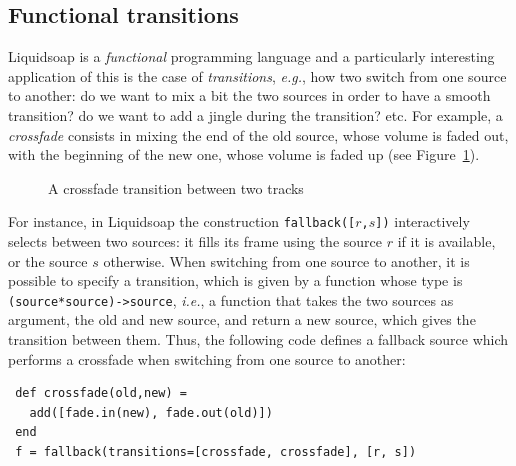 \documentclass{llncs}
\newcommand{\liquidsoap}{Liquidsoap}
\newcommand{\eg}{\emph{e.g.},}
\newcommand{\ie}{\emph{i.e.},}
\newcommand{\fcaption}[1]{\vspace{-3ex}\caption{#1}\vspace{-4ex}}
\begin{document}
\subsection{Functional transitions}
\label{sec:transitions}

\liquidsoap{} is a \emph{functional} programming language and a particularly
interesting application of this is the case of \textit{transitions}, 
\eg{} how two switch from one source to another: do we
want to mix a bit the two sources in order to have a smooth transition? do we
want to add a jingle during the transition? etc. For example, a \emph{crossfade}
consists in mixing the end of the old source, whose volume is faded out, with the
beginning of the new one, whose volume is faded up (see Figure~\ref{fig:cross}).
\vspace{-5ex}
\begin{figure}[h]
 \begin{center}
\end{center}
 \fcaption{A crossfade transition between two tracks}
 \label{fig:cross}
\end{figure}

For instance, in \liquidsoap{} the construction \texttt{fallback([$r$,$s$])} interactively
selects between two sources: it fills its frame using the source \texttt{$r$} if
it is available, or the source \texttt{$s$} otherwise.  When switching from
one source to another, it is possible to specify a transition, which is given by
a function whose type is \hbox{\texttt{(source*source)->source}}, \ie{} a
function that takes the two sources as argument, the old and new source, and
return a new source, which gives the transition between them. Thus, the
following code defines a fallback source which performs a crossfade when
switching from one source to another:
\begin{verbatim}
 def crossfade(old,new) =
   add([fade.in(new), fade.out(old)])
 end
 f = fallback(transitions=[crossfade, crossfade], [r, s])
\end{verbatim}
\end{document}
